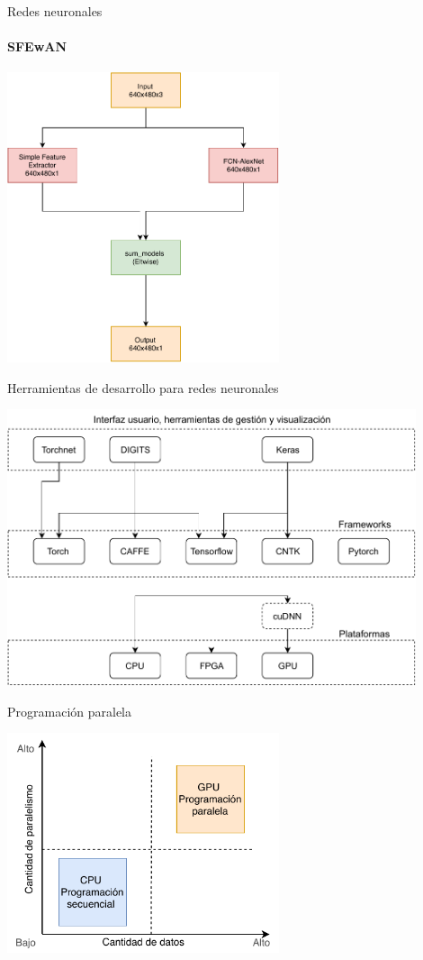 \begin{frame}{Redes neuronales}
\framesubtitle{SFEwAN}
	\centering
 \includegraphics[width=0.6\textwidth]{anexo/sfewan.pdf}
\end{frame}




\begin{frame}{Herramientas de desarrollo para redes neuronales}

	\centering
 \includegraphics[width=0.9\textwidth]{fig/DL-frameworks.pdf}

\end{frame}


\begin{frame}{Programación paralela}

\centering
 \includegraphics[width=0.6\textwidth]{fig/paralelismo.pdf}

\end{frame}


